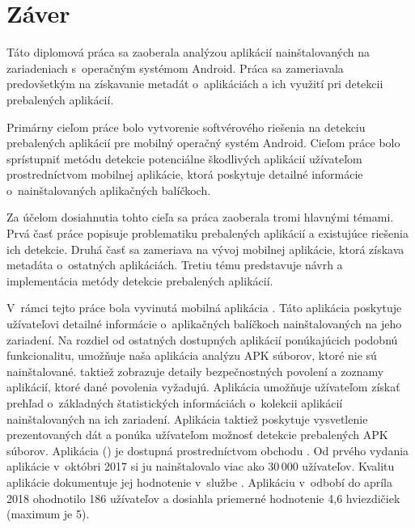\chapter*{Záver}
Táto diplomová práca sa zaoberala analýzou aplikácií nainštalovaných na zariadeniach s~operačným systémom Android. Práca sa zameriavala predovšetkým na získavanie metadát o~aplikáciách a ich využití pri detekcii prebalených aplikácií.

Primárny cieľom práce bolo vytvorenie softvérového riešenia na detekciu prebalených aplikácií pre mobilný operačný systém Android. Cieľom práce bolo sprístupniť metódu detekcie potenciálne škodlivých aplikácií užívateľom prostredníctvom mobilnej aplikácie, ktorá poskytuje detailné informácie o~nainštalovaných aplikačných balíčkoch.  

Za účelom dosiahnutia tohto cieľa sa práca zaoberala tromi hlavnými témami. Prvá časť práce popisuje problematiku prebalených aplikácií a existujúce riešenia ich detekcie. Druhá časť sa zameriava na vývoj mobilnej aplikácie, ktorá získava metadáta o~ostatných aplikáciách. Tretiu tému predstavuje návrh a implementácia metódy detekcie prebalených aplikácií. 

V~rámci tejto práce bola vyvinutá mobilná aplikácia . Táto aplikácia poskytuje užívateľovi detailné informácie o~aplikačných balíčkoch nainštalovaných na jeho zariadení. Na rozdiel od ostatných dostupných aplikácií ponúkajúcich podobnú funkcionalitu, umožňuje naša aplikácia analýzu APK súborov, ktoré nie sú nainštalované.  taktiež zobrazuje detaily bezpečnostných povolení a zoznamy aplikácií, ktoré dané povolenia vyžadujú. Aplikácia umožňuje užívateľom získať prehľad o~základných štatistických informáciách o~kolekcii aplikácií nainštalovaných na ich zariadení. Aplikácia taktiež poskytuje vysvetlenie prezentovaných dát a ponúka užívateľom možnosť detekcie prebalených APK súborov. Aplikácia  () je dostupná prostredníctvom obchodu . Od prvého vydania aplikácie v~októbri 2017 si ju nainštalovalo viac ako 30\,000 užívateľov. Kvalitu aplikácie dokumentuje jej hodnotenie v~službe . Aplikáciu v~odbobí do apríla 2018 ohodnotilo 186 užívateľov a dosiahla priemerné hodnotenie 4,6 hviezdičiek (maximum je 5).

